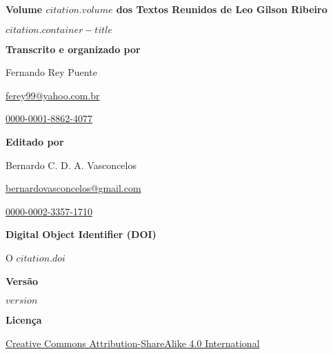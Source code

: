 \newpage

\thispagestyle{empty}
\bigskip

{\large{\textbf{Volume $citation.volume$ dos Textos Reunidos de Leo Gilson Ribeiro}}}

\bigskip

{\large{$citation.container-title$}}

\vfill

\textbf{Transcrito e organizado por}\smallskip

Fernando Rey Puente

\smallskip

\href{mailto:ferey99@yahoo.com.br}{ferey99@yahoo.com.br}

\smallskip

 \href{https://orcid.org/0000-0001-8862-4077}{0000-0001-8862-4077}

\vfill

\textbf{Editado por}

\smallskip

Bernardo C. D. A. Vasconcelos

\smallskip

\href{mailto:bernardovasconcelos@gmail.com}{bernardovasconcelos@gmail.com}

\smallskip

 \href{https://orcid.org/0000-0002-3357-1710}{0000-0002-3357-1710}

\vfill

\textbf{Digital Object Identifier (DOI)}

\smallskip

 {O} \href{https://doi.org/$citation.doi$}{$citation.doi$}

\vfill

\textbf{Versão}

\smallskip

$version$

\vfill

\textbf{Licença}

\smallskip

\ccbysa

\smallskip

\href{https://creativecommons.org/licenses/by-sa/4.0/}{Creative Commons Attribution-ShareAlike 4.0 International}

\cleardoublepage

